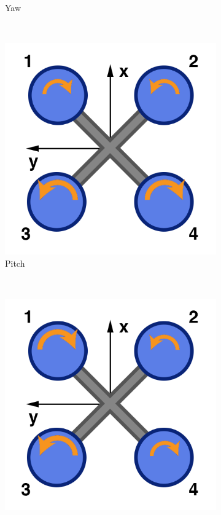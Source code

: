 \begin{figure}[ht]
\begin{subfigure}[b]{0.4\textwidth}
                        \caption{Yaw}
                        \label{fig:yaw}
                \end{subfigure}
                \\
                \begin{subfigure}[b]{0.4\textwidth}
                        \centering
                        \includegraphics[width=\textwidth]{../images/pitch.png}
                        \caption{Pitch}
                        \label{fig:pitch}
                \end{subfigure}
                ~
                \begin{subfigure}[b]{0.4\textwidth}
                        \centering
                        \includegraphics[width=\textwidth]{../images/roll.png}

\end{subfigure}
\end{figure}
